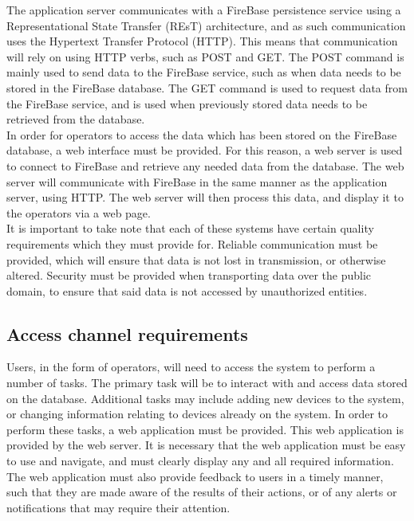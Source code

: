 \documentclass{article}
\begin{document}
	The application server communicates with a FireBase persistence 
	service using a Representational State Transfer (REsT) architecture, 
	and as such communication uses the Hypertext Transfer Protocol 
	(HTTP). This means that communication will rely on using HTTP verbs, 
	such as POST and GET. The POST command is mainly used to send data to 
	the FireBase service, such as when data needs to be stored in the 
	FireBase database. The GET command is used to request data from the 
	FireBase service, and is used when previously stored data needs to be 
	retrieved from the database.\\
	
	In order for operators to access the data which has been stored on 
	the FireBase database, a web interface must be provided. For this 
	reason, a web server is used to connect to FireBase and retrieve any 
	needed data from the database. The web server will communicate with 
	FireBase in the same manner as the application server, using HTTP. 
	The web server will then process this data, and display it to the 
	operators via a web page.\\
	
	It is important to take note that each of these systems have certain 
	quality requirements which they must provide for. Reliable 
	communication must be provided, which will ensure that data is not 
	lost in transmission, or otherwise altered. Security must be provided 
	when transporting data over the public domain, to ensure that said 
	data is not accessed by unauthorized entities.
	
	\newpage
	
	\subsection{Access channel requirements}
	
	Users, in the form of operators, will need to access the system to 
	perform a number of tasks. The primary task will be to interact with 
	and access data stored on the database. Additional tasks may include 
	adding new devices to the system, or changing information relating to 
	devices already on the system. In order to perform these tasks, a web 
	application must be provided. This web application is provided by the 
	web server. It is necessary that the web application must be easy to 
	use and navigate, and must clearly display any and all required 
	information. The web application must also provide feedback to users 
	in a timely manner, such that they are made aware of the results of 
	their actions, or of any alerts or notifications that may require 
	their attention.\\
	
\end{document}
